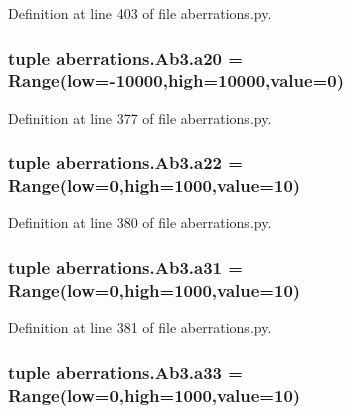 Definition at line 403 of file aberrations.\-py.

\hypertarget{classaberrations_1_1_ab3_a715ff78e10a0a75678493af40ff63ca1}{
\subsubsection[{a20}]{\setlength{\rightskip}{0pt plus 5cm}tuple aberrations.\-Ab3.\-a20 = Range(low=-\/10000,high=10000,{\bf value}=0)\hspace{0.3cm}{\ttfamily [static]}}}\label{classaberrations_1_1_ab3_a715ff78e10a0a75678493af40ff63ca1}


Definition at line 377 of file aberrations.\-py.

\hypertarget{classaberrations_1_1_ab3_a156045dd2125a70fb302763bbba3acc7}{
\subsubsection[{a22}]{\setlength{\rightskip}{0pt plus 5cm}tuple aberrations.\-Ab3.\-a22 = Range(low=0,high=1000,{\bf value}=10)\hspace{0.3cm}{\ttfamily [static]}}}\label{classaberrations_1_1_ab3_a156045dd2125a70fb302763bbba3acc7}


Definition at line 380 of file aberrations.\-py.

\hypertarget{classaberrations_1_1_ab3_a9441ccb42434e133bc7f04cd7545f91d}{
\subsubsection[{a31}]{\setlength{\rightskip}{0pt plus 5cm}tuple aberrations.\-Ab3.\-a31 = Range(low=0,high=1000,{\bf value}=10)\hspace{0.3cm}{\ttfamily [static]}}}\label{classaberrations_1_1_ab3_a9441ccb42434e133bc7f04cd7545f91d}


Definition at line 381 of file aberrations.\-py.

\hypertarget{classaberrations_1_1_ab3_a507a723cf8799c2851689827296a9658}{
\subsubsection[{a33}]{\setlength{\rightskip}{0pt plus 5cm}tuple aberrations.\-Ab3.\-a33 = Range(low=0,high=1000,{\bf value}=10)\hspace{0.3cm}{\ttfamily [static]}}}\label{classaberrations_1_1_ab3_a507a723cf8799c2851689827296a9658}


